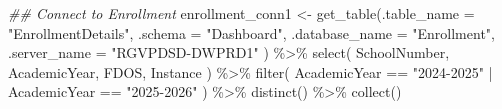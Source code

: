 \documentclass[
  letterpaper,
  DIV=11,
  numbers=noendperiod]{scrreprt}
\newenvironment{Shaded}{\begin{snugshade}}{\end{snugshade}}
\newcommand{\AttributeTok}[1]{\textcolor[rgb]{0.40,0.45,0.13}{#1}}
\newcommand{\DocumentationTok}[1]{\textcolor[rgb]{0.37,0.37,0.37}{\textit{#1}}}
\newcommand{\FunctionTok}[1]{\textcolor[rgb]{0.28,0.35,0.67}{#1}}
\newcommand{\NormalTok}[1]{\textcolor[rgb]{0.00,0.23,0.31}{#1}}
\newcommand{\OtherTok}[1]{\textcolor[rgb]{0.00,0.23,0.31}{#1}}
\newcommand{\SpecialCharTok}[1]{\textcolor[rgb]{0.37,0.37,0.37}{#1}}
\newcommand{\StringTok}[1]{\textcolor[rgb]{0.13,0.47,0.30}{#1}}
\begin{document}
\begin{Shaded}
\begin{Highlighting}[]
\DocumentationTok{\#\# Connect to Enrollment}
\NormalTok{enrollment\_conn1 }\OtherTok{\textless{}{-}} \FunctionTok{get\_table}\NormalTok{(}\AttributeTok{.table\_name =} \StringTok{"EnrollmentDetails"}\NormalTok{,}
                              \AttributeTok{.schema =} \StringTok{"Dashboard"}\NormalTok{,}
                              \AttributeTok{.database\_name =} \StringTok{"Enrollment"}\NormalTok{,}
                              \AttributeTok{.server\_name =} \StringTok{"RGVPDSD{-}DWPRD1"}
\NormalTok{                             ) }\SpecialCharTok{\%\textgreater{}\%}
  \FunctionTok{select}\NormalTok{(}
\NormalTok{    SchoolNumber,}
\NormalTok{    AcademicYear, }
\NormalTok{    FDOS, }
\NormalTok{    Instance}
\NormalTok{  ) }\SpecialCharTok{\%\textgreater{}\%}
  \FunctionTok{filter}\NormalTok{(}
\NormalTok{    AcademicYear }\SpecialCharTok{==} \StringTok{"2024{-}2025"} \SpecialCharTok{|} 
\NormalTok{    AcademicYear }\SpecialCharTok{==} \StringTok{"2025{-}2026"}
\NormalTok{  ) }\SpecialCharTok{\%\textgreater{}\%}
  \FunctionTok{distinct}\NormalTok{() }\SpecialCharTok{\%\textgreater{}\%}
  \FunctionTok{collect}\NormalTok{()}



\end{Highlighting}
\end{Shaded}
\end{document}
